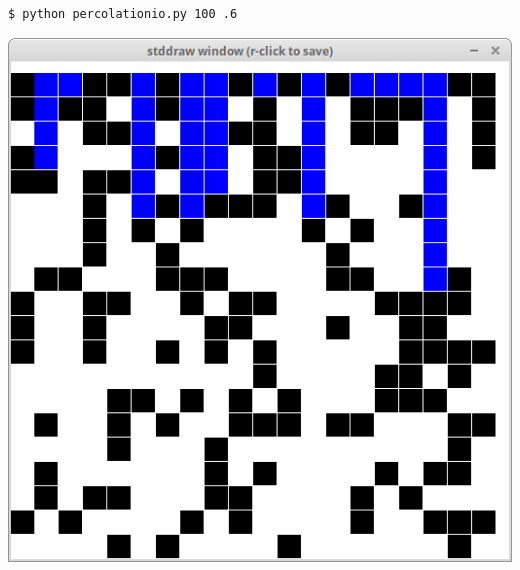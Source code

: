 \documentclass[8pt,a4paper,compress,handout]{beamer}
\begin{document}
\begin{frame}[fragile]
\begin{minipage}{160pt}
\begin{lstlisting}[language={}]
$ python percolationio.py 100 .6
\end{lstlisting}
\end{minipage}%
\begin{minipage}{140pt}
\hfill \includegraphics[scale=0.15]{figures/percolation4.png}
\end{minipage}
\end{frame}
\end{document}
